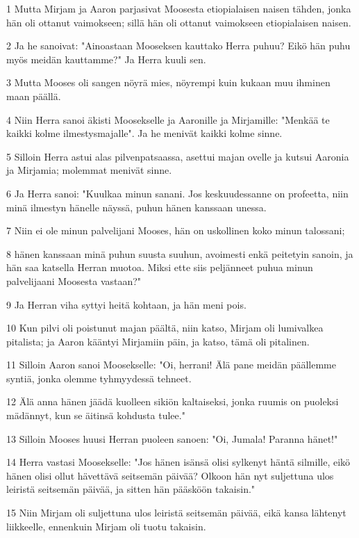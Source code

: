 \par 1 Mutta Mirjam ja Aaron parjasivat Moosesta etiopialaisen naisen tähden, jonka hän oli ottanut vaimokseen; sillä hän oli ottanut vaimokseen etiopialaisen naisen.
\par 2 Ja he sanoivat: "Ainoastaan Mooseksen kauttako Herra puhuu? Eikö hän puhu myös meidän kauttamme?" Ja Herra kuuli sen.
\par 3 Mutta Mooses oli sangen nöyrä mies, nöyrempi kuin kukaan muu ihminen maan päällä.
\par 4 Niin Herra sanoi äkisti Moosekselle ja Aaronille ja Mirjamille: "Menkää te kaikki kolme ilmestysmajalle". Ja he menivät kaikki kolme sinne.
\par 5 Silloin Herra astui alas pilvenpatsaassa, asettui majan ovelle ja kutsui Aaronia ja Mirjamia; molemmat menivät sinne.
\par 6 Ja Herra sanoi: "Kuulkaa minun sanani. Jos keskuudessanne on profeetta, niin minä ilmestyn hänelle näyssä, puhun hänen kanssaan unessa.
\par 7 Niin ei ole minun palvelijani Mooses, hän on uskollinen koko minun talossani;
\par 8 hänen kanssaan minä puhun suusta suuhun, avoimesti enkä peitetyin sanoin, ja hän saa katsella Herran muotoa. Miksi ette siis peljänneet puhua minun palvelijaani Moosesta vastaan?"
\par 9 Ja Herran viha syttyi heitä kohtaan, ja hän meni pois.
\par 10 Kun pilvi oli poistunut majan päältä, niin katso, Mirjam oli lumivalkea pitalista; ja Aaron kääntyi Mirjamiin päin, ja katso, tämä oli pitalinen.
\par 11 Silloin Aaron sanoi Moosekselle: "Oi, herrani! Älä pane meidän päällemme syntiä, jonka olemme tyhmyydessä tehneet.
\par 12 Älä anna hänen jäädä kuolleen sikiön kaltaiseksi, jonka ruumis on puoleksi mädännyt, kun se äitinsä kohdusta tulee."
\par 13 Silloin Mooses huusi Herran puoleen sanoen: "Oi, Jumala! Paranna hänet!"
\par 14 Herra vastasi Moosekselle: "Jos hänen isänsä olisi sylkenyt häntä silmille, eikö hänen olisi ollut hävettävä seitsemän päivää? Olkoon hän nyt suljettuna ulos leiristä seitsemän päivää, ja sitten hän pääsköön takaisin."
\par 15 Niin Mirjam oli suljettuna ulos leiristä seitsemän päivää, eikä kansa lähtenyt liikkeelle, ennenkuin Mirjam oli tuotu takaisin.

